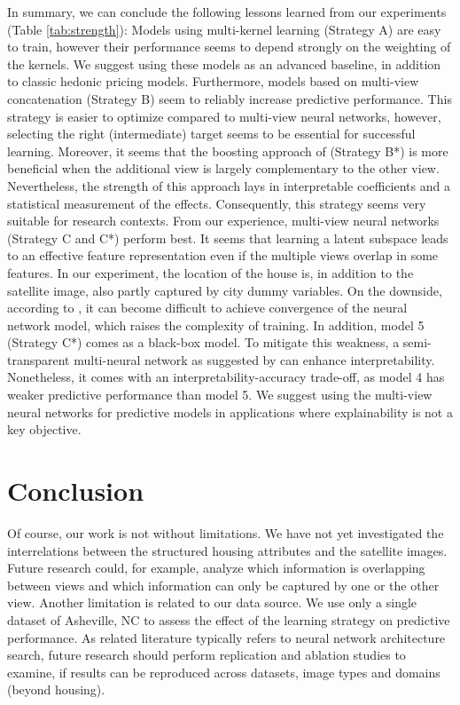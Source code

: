 \documentclass[letterpaper]{article} %
\begin{document}
In summary, we can conclude the following lessons learned from our experiments (Table \ref{tab:strength}): Models using multi-kernel learning (Strategy A) are easy to train, however their performance seems to depend strongly on the weighting of the kernels. We suggest using these models as an advanced baseline, in addition to classic hedonic pricing models. Furthermore, models based on multi-view concatenation (Strategy B) seem to reliably increase predictive performance. This strategy is easier to optimize compared to multi-view neural networks, however, selecting the right (intermediate) target seems to be essential for successful learning. Moreover, it seems that the boosting approach of \citeauthor{naumzik2020one} \citeyearpar{naumzik2020one} (Strategy B*) is more beneficial when the additional view is largely complementary to the other view. Nevertheless, the strength of this approach lays in interpretable coefficients and a statistical measurement of the effects. Consequently, this strategy seems very suitable for research contexts. From our experience, multi-view neural networks (Strategy C and C*) perform best. It seems that learning a latent subspace leads to an effective feature representation even if the multiple views overlap in some features. In our experiment, the location of the house is, in addition to the satellite image, also partly captured by city dummy variables. On the downside, according to \citeauthor{bency2017beyond} \citeyearpar{bency2017beyond}, it can become difficult to achieve convergence of the neural network model, which raises the complexity of training. In addition, model 5 (Strategy C*) comes as a black-box model. To mitigate this weakness, a semi-transparent multi-neural network as suggested by \citeauthor{law2019take} \citeyearpar{law2019take} can enhance interpretability. Nonetheless, it comes with an interpretability-accuracy trade-off, as model 4 has weaker predictive performance than model 5. We suggest using the multi-view neural networks for predictive models in applications where explainability is not a key objective.

\vspace{-3.05mm}
\section{Conclusion}
Of course, our work is not without limitations. We have not yet investigated the interrelations between the structured housing attributes and the satellite images. Future research could, for example, analyze which information is overlapping between views and which information can only be captured by one or the other view. Another limitation is related to our data source. We use only a single dataset of Asheville, NC to assess the effect of the learning strategy on predictive performance. As related literature typically refers to neural network architecture search, future research should perform replication and ablation studies to examine, if results can be reproduced across datasets, image types and domains (beyond housing).
\end{document}
